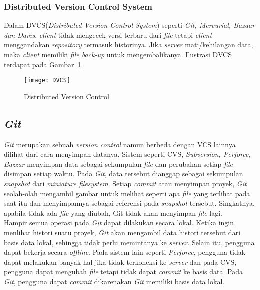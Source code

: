 \subsubsection{Distributed Version Control System}
Dalam DVCS(\textit{Distributed Version Control System}) seperti \textit{Git, Mercurial, Bazaar dan Darcs}, \textit{client} tidak mengecek versi terbaru dari \textit{file} tetapi \textit{client} menggandakan \textit{repository} termasuk historinya. Jika \textit{server} mati/kehilangan data, maka \textit{client} memiliki \textit{file back-up} untuk mengembalikanya.  Ilustrasi DVCS terdapat pada Gambar~\ref{fig:DVCS}.

\begin{figure}[H]
	\centering  
	\texttt{[image: DVCS]}  
	\caption[Distributed Version Control]{Distributed Version Control}
	\label{fig:DVCS} 
\end{figure}

\subsection{\textit{Git}}
\textit{Git} merupakan sebuah \textit{version control} namun berbeda dengan VCS lainnya dilihat dari cara menyimpan datanya. Sistem seperti CVS, \textit{Subversion, Perforce, Bazzar} menyimpan data sebagai sekumpulan \textit{file} dan perubahan setiap \textit{file} disimpan setiap waktu. Pada \textit{Git}, data tersebut dianggap sebagai sekumpulan \textit{snapshot} dari \textit{miniature filesystem}. Setiap \textit{commit} atau menyimpan proyek, \textit{Git} seolah-olah mengambil gambar untuk melihat seperti apa \textit{file} yang terlihat pada saat itu dan menyimpannya sebagai referensi pada \textit{snapshot} tersebut. Singkatnya, apabila tidak ada \textit{file} yang diubah, Git tidak akan menyimpan \textit{file} lagi.\\

Hampir semua operasi pada \textit{Git} dapat dilakukan secara lokal. Ketika ingin menlihat histori suatu proyek, \textit{Git} akan mengambil data histori tersebut dari basis data lokal, sehingga tidak perlu memintanya ke \textit{server}. Selain itu, pengguna dapat bekerja secara \textit{offline}. Pada sistem lain seperti \textit{Perforce}, pengguna tidak dapat melakukan banyak hal jika tidak terkoneksi ke \textit{server} dan pada CVS, pengguna dapat mengubah \textit{file} tetapi tidak dapat \textit{commit} ke basis data. Pada \textit{Git}, pengguna dapat \textit{commit} dikarenakan \textit{Git} memiliki basis data lokal.\\

